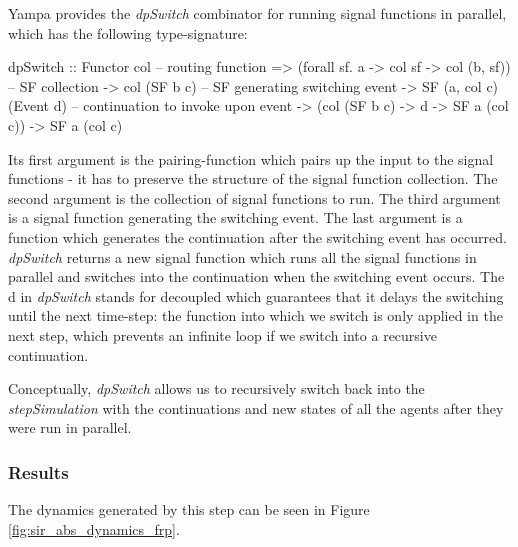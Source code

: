 Yampa provides the \textit{dpSwitch} combinator for running signal functions in parallel, which has the following type-signature:

\begin{HaskellCode}
dpSwitch :: Functor col
         -- routing function
         => (forall sf. a -> col sf -> col (b, sf))
         -- SF collection
         -> col (SF b c)
         -- SF generating switching event     
         -> SF (a, col c) (Event d)
         -- continuation to invoke upon event           
         -> (col (SF b c) -> d -> SF a (col c))
         -> SF a (col c)
\end{HaskellCode}

Its first argument is the pairing-function which pairs up the input to the signal functions - it has to preserve the structure of the signal function collection. The second argument is the collection of signal functions to run. The third argument is a signal function generating the switching event. The last argument is a function which generates the continuation after the switching event has occurred. \textit{dpSwitch} returns a new signal function which runs all the signal functions in parallel and switches into the continuation when the switching event occurs. The d in \textit{dpSwitch} stands for decoupled which guarantees that it delays the switching until the next time-step: the function into which we switch is only applied in the next step, which prevents an infinite loop if we switch into a recursive continuation.

Conceptually, \textit{dpSwitch} allows us to recursively switch back into the \textit{stepSimulation} with the continuations and new states of all the agents after they were run in parallel. 

\subsubsection{Results}
The dynamics generated by this step can be seen in Figure \ref{fig:sir_abs_dynamics_frp}. 

